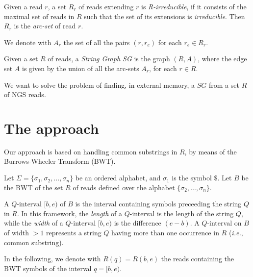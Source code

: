 \documentclass[runningheads,envcountsame,a4paper]{llncs}
\newcommand{\ie}{\textit{i.e.},\xspace}
\begin{document}
Given a read $r$, a set $R_r$ of reads extending $r$ is \emph{R-irreducible}, if it consists of the maximal set of reads in $R$ such that the set of its extensions  is \emph{irreducible}.
Then $R_r$ is the {\em arc-set} of  read $r$.

We denote with $A_r$ the set of all the pairs $(r, r_e)$ for each $r_e \in R_r$.

\begin{definition}
Given a set $R$ of reads, a \emph{String Graph SG} is the graph $(R, A)$, where the edge set $A$ is given by the union of all the arc-sets $A_r$, for each $r \in R$.
\end{definition}

We want to solve the problem of finding, in external memory, a $SG$ from a set $R$ of NGS reads.




\section*{The approach}

%

Our approach is based on handling common substrings in $R$, by means of the Burrows-Wheeler Transform (BWT).

Let $\Sigma=\{\sigma_1, \sigma_2, \ldots, \sigma_n\}$ be an ordered alphabet, and $\sigma_1$ is the symbol $\$$. Let $B$ be the BWT of the set $R$ of reads defined over the alphabet $\{\sigma_2, \ldots, \sigma_n\}$.

A $Q$-interval $[b,e)$ of $B$ is the interval containing symbols preceeding the string $Q$ in $R$. In this framework, the \emph{length} of a $Q$-interval is the length of the string $Q$, while the \emph{width} of a $Q$-interval $[b, e)$ is the difference $(e-b)$. A $Q$-interval on $B$ of width $>1$ represents a string $Q$ having more than one occurrence in $R$ (\ie common substring).

In the following, we denote with $R(q)=R(b,e)$ the reads containing the BWT symbols of the interval $q=[b,e)$.
\end{document}
